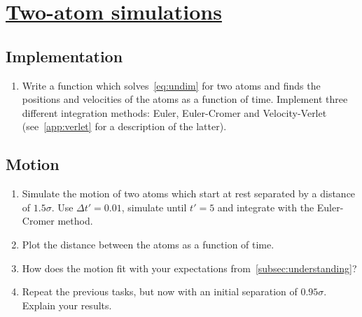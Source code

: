 \documentclass[11pt,english,a4paper]{report}
\begin{document}
\section{\underline{Two-atom simulations}}

\subsection{Implementation}
\begin{enumerate}[label=\roman*.]
    \item Write a function which solves~\vref{eq:undim} for two atoms and finds the positions and velocities of the atoms as a function of time. Implement three different integration methods:
        Euler, Euler-Cromer and Velocity-Verlet (see~\vref{app:verlet} for a description of the latter).
\end{enumerate}

\subsection{Motion}\label{subsec:2motion}
\begin{enumerate}[label=\roman*.]
    \item Simulate the motion of two atoms which start at rest separated by a distance of \(\num{1.5}\sigma\). Use \(\Delta t'=\num{0.01}\), simulate until \(t'=5\) and integrate with the Euler-Cromer method.
    \item Plot the distance between the atoms as a function of time.
    \item How does the motion fit with your expectations from~\vref{subsec:understanding}?
    \item Repeat the previous tasks, but now with an initial separation of \(\num{0.95}\sigma\). Explain your results.
\end{enumerate}
\end{document}

